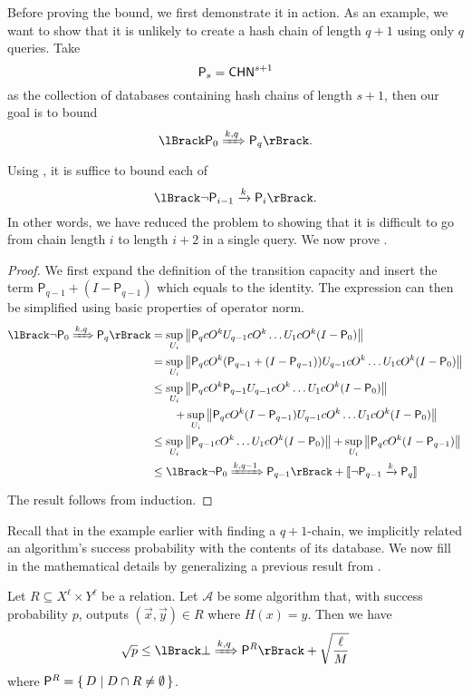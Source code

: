 Before proving the bound, we first demonstrate it in action.
As an example, we want to show that it is unlikely to create a hash chain of length $q+1$ using only $q$ queries.
Take
$$\mathsf{P}_s=\mathsf{CHN}^{s+1}$$
as the collection of databases containing hash chains of length $s+1$,
then our goal is to bound
$$\lBrack\sfP_0\xRightarrow{k,q}\sfP_q\rBrack.$$
Using , it is suffice to bound each of
$$\lBrack\neg \sfP_{i-1}\xrightarrow{k}\sfP_i\rBrack.$$
In other words, we have reduced the problem to showing that it is difficult to go from chain length $i$ to length $i+2$ in a single query.
We now prove .

\begin{proof}
	We first expand the definition of the transition capacity and insert the term $\mathsf{P}_{q-1}+(I-\mathsf{P}_{q-1})$ which equals to the identity.
	The expression can then be simplified using basic properties of operator norm.
	\begin{align*}
		\lBrack\neg \mathsf{P}_0\xRightarrow{k,q}\mathsf{P}_q\rBrack
			&=\sup_{U_i}\norm{\mathsf{P}_q cO^k U_{q-1} cO^k\ldots U_1 cO^k (I-\mathsf{P}_0)} \\
			&=\sup_{U_i}\norm{\mathsf{P}_q cO^k (\mathsf{P}_{q-1}+(I-\mathsf{P}_{q-1})) U_{q-1} cO^k\ldots U_1 cO^k (I-\mathsf{P}_0)}\\
			&\leq\sup_{U_i}\norm{\mathsf{P}_q cO^k \mathsf{P}_{q-1} U_{q-1} cO^k\ldots U_1 cO^k (I-\mathsf{P}_0)}\\
			&\qquad+\sup_{U_i}\norm{\mathsf{P}_q cO^k (I-\mathsf{P}_{q-1}) U_{q-1} cO^k\ldots U_1 cO^k (I-\mathsf{P}_0)}\\
			&\leq\sup_{U_i} \norm{\mathsf{P}_{q-1} cO^k\ldots U_1 cO^k (I-\mathsf{P}_0)}+\sup_{U_i} \norm{\mathsf{P}_q cO^k (I-\mathsf{P}_{q-1})}\\
			&\leq\lBrack\neg \mathsf{P}_0\xRightarrow{k,q-1}\mathsf{P}_{q-1}\rBrack+[\![\neg \mathsf{P}_{q-1}\xrightarrow{k}\mathsf{P}_q]\!]
	\end{align*}
	The result follows from induction.
\end{proof}

Recall that in the example earlier with finding a $q+1$-chain,
we implicitly related an algorithm's success probability with the contents of its database.
We now fill in the mathematical details by generalizing a previous result from \cite{compressed-oracles}.
\begin{thm}
	\label{zhandry-database}
	Let $R\subseteq X^\ell\times Y^\ell$ be a relation.
	Let $\mathcal{A}$ be some algorithm that, with success probability $p$, outputs $(\vec{x}, \vec{y})\in R$ where $H(x)=y$.
	Then we have
	$$\sqrt{p}\leq\lBrack\bot\xRightarrow{k, q} \mathsf{P}^R\rBrack+\sqrt{\frac{\ell}{M}}$$
	where $\mathsf{P}^R=\set{D | D\cap R\ne\emptyset}$.
\end{thm}

